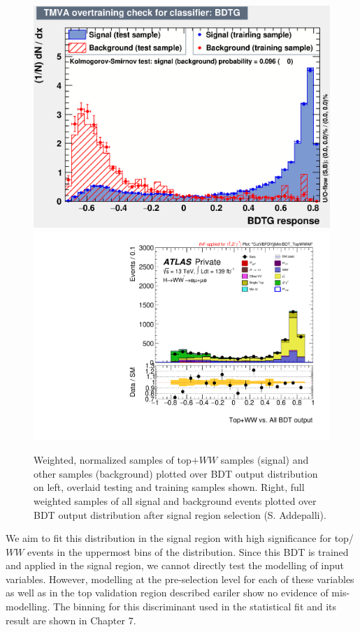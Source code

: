 \begin{figure}[!htbp]
\centering
  \includegraphics[width=.4\linewidth]{Pictures/Top+WWvsEverything/overtrain_BDTG.eps}
  \includegraphics[width=.45\linewidth]{Pictures/run2-emme-CutVBFDYjjMin-BDT_TopWWAll-lin.pdf}
\caption{Weighted, normalized samples of top$+WW$ samples (signal) and other samples (background) plotted over BDT output distribution on left, overlaid testing and training samples shown. Right, full weighted samples of all signal and background events plotted over BDT output distribution after signal region selection (S. Addepalli).}
\label{fig:TopBDTresult}
\end{figure}

We aim to fit this distribution in the signal region with high significance for top/$WW$ events in the uppermost bins of the distribution. Since this BDT is trained and applied in the signal region, we cannot directly test the modelling of input variables. However, modelling at the pre-selection level for each of these variables as well as in the top validation region described eariler show no evidence of mis-modelling. The binning for this discriminant used in the statistical fit and its result are shown in Chapter 7.

